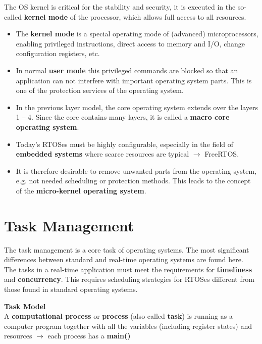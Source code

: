 The OS kernel is critical for the stability and security, it is executed in the so-called \textbf{kernel mode} of the processor, which allows full access to all resources.

\begin{itemize}
\item The \textbf{kernel mode} is a special operating mode of (advanced) microprocessors, enabling privileged instructions, direct access to memory and I/O, change configuration registers, etc.
\item In normal \textbf{user mode} this privileged commands are blocked so that an application can not interfere with important operating system parts. This is one of the protection services of the operating system.
\item In the previous layer model, the core operating system extends over the layers 1 -- 4. Since the core contains many layers, it is called a \textbf{macro core operating system}.
\item Today's RTOSes must be highly configurable, especially in the field of \textbf{embedded systems} where scarce resources are typical  $\rightarrow$ FreeRTOS.
\item It is therefore desirable to remove unwanted parts from the operating system, e.g. not needed scheduling or protection methods. This leads to the concept of the \textbf{micro-kernel operating system}.
\end{itemize}

\section{Task Management}

The task management is a core task of operating systems. The most significant differences between standard and real-time operating systems are found here.\\

The tasks in a real-time application must meet the requirements for \textbf{timeliness} and \textbf{concurrency}. This requires scheduling strategies for RTOSes different from those found in  standard operating systems.\\
\os{\newpage}

{\rot\bf Task Model}\\

A \textbf{computational process} or \textbf{process} (also called \textbf{task}) is running as a computer program together with all the variables (including register states) and resources  $\rightarrow$ each process has a \textbf{main()}\\

